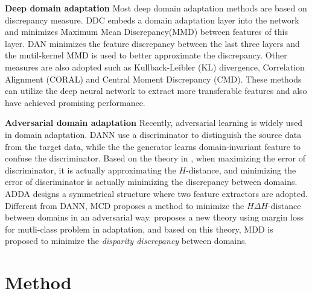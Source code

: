\documentclass{ecai}
\begin{document}
\textbf{Deep domain adaptation} Most deep domain adaptation methods are based on discrepancy measure. DDC\cite{b29} embeds a domain adaptation layer into the network and minimizes Maximum Mean Discrepancy(MMD) between features of this layer. DAN\cite{b9} minimizes the feature discrepancy between the last three layers and  the mutil-kernel MMD is used to better approximate the discrepancy. Other measures are also adopted such as Kullback-Leibler (KL) divergence\cite{b26}, Correlation Alignment (CORAL)\cite{b25} and Central Moment Discrepancy (CMD)\cite{b27}. These methods can utilize the deep neural network to extract more transferable features and also have achieved promising performance.

\textbf{Adversarial domain adaptation}
Recently, adversarial learning is widely used in domain adaptation. DANN\cite{b18} use a discriminator to distinguish the source data from the target data, while the the generator learns domain-invariant feature to confuse the discriminator. Based on the theory in \cite{b3}, when maximizing the error of discriminator, it is actually approximating the $H$-distance, and minimizing the error of discriminator is actually minimizing the discrepancy between domains. ADDA\cite{b33} designs a symmetrical structure where two feature extractors are adopted. Different from DANN, MCD\cite{b24} proposes a method to minimize the $H \Delta H$-distance between domains in an adversarial way. \cite{b37} proposes a new theory using margin loss for mutli-class problem in adaptation, and based on this theory, MDD is proposed to minimize the {\emph{disparity discrepancy}} between domains.





\section{Method}
\end{document}
